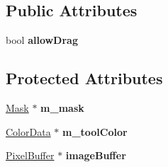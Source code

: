 \subsection*{Public Attributes}
\begin{DoxyCompactItemize}
\item 
\hypertarget{classDrawTool_a87f991a7c84a4c5ad60ebbfd813a3ab2}{bool {\bfseries allow\-Drag}}\label{classDrawTool_a87f991a7c84a4c5ad60ebbfd813a3ab2}

\end{DoxyCompactItemize}
\subsection*{Protected Attributes}
\begin{DoxyCompactItemize}
\item 
\hypertarget{classDrawTool_a0a3cc5165047f1158bff38750ddf8e85}{\hyperlink{classMask}{Mask} $\ast$ {\bfseries m\-\_\-mask}}\label{classDrawTool_a0a3cc5165047f1158bff38750ddf8e85}

\item 
\hypertarget{classDrawTool_a3bb9153560d2b084c56d5e7d749d49a2}{\hyperlink{classColorData}{Color\-Data} $\ast$ {\bfseries m\-\_\-tool\-Color}}\label{classDrawTool_a3bb9153560d2b084c56d5e7d749d49a2}

\item 
\hypertarget{classDrawTool_a917dfe1261ea0d5c4250f8b83eddb177}{\hyperlink{classPixelBuffer}{Pixel\-Buffer} $\ast$ {\bfseries image\-Buffer}}\label{classDrawTool_a917dfe1261ea0d5c4250f8b83eddb177}

\end{DoxyCompactItemize}


